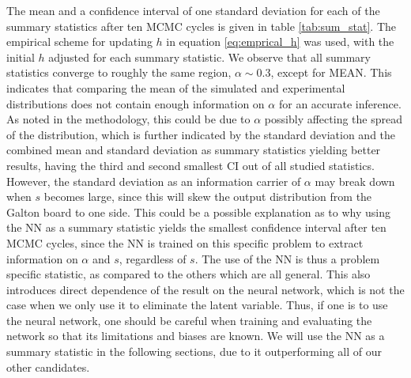 \documentclass[11pt,a4paper]{article}
\begin{document}
The mean and a confidence interval of one standard deviation for each of the summary statistics after ten MCMC cycles is given in table \ref{tab:sum_stat}. The empirical scheme for updating $h$ in equation \eqref{eq:emprical_h} was used, with the initial $h$ adjusted for each summary statistic. We observe that all summary statistics converge to roughly the same region, $\alpha \sim 0.3$, except for MEAN. This indicates that comparing the mean of the simulated and experimental distributions does not contain enough information on $\alpha$ for an accurate inference. As noted in the methodology, this could be due to $\alpha$ possibly affecting the spread of the distribution, which is further indicated by the standard deviation and the combined mean and standard deviation as summary statistics yielding better results, having the third and second smallest CI out of all studied statistics. However, the standard deviation as an information carrier of $\alpha$ may break down when $s$ becomes large, since this will skew the output distribution from the Galton board to one side. This could be a possible explanation as to why using the NN as a summary statistic yields the smallest confidence interval after ten MCMC cycles, since the NN is trained on this specific problem to extract information on $\alpha$ and $s$, regardless of $s$. The use of the NN is thus a problem specific statistic, as compared to the others which are all general. This also introduces direct dependence of the result on the neural network, which is not the case when we only use it to eliminate the latent variable. Thus, if one is to use the neural network, one should be careful when training and evaluating the network so that its limitations and biases are known. We will use the NN as a summary statistic in the following sections, due to it outperforming all of our other candidates.
\end{document}
